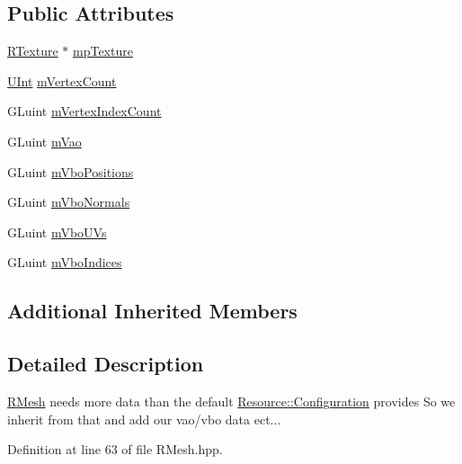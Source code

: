 \subsection*{Public Attributes}
\begin{DoxyCompactItemize}
\item 
\hyperlink{classgl_1_1_r_texture}{R\-Texture} $\ast$ \hyperlink{classgl_1_1_r_mesh_1_1_configuration_ab1700b1f9397d2176155d3403be81042}{mp\-Texture}
\item 
\hyperlink{_basic_types_8hpp_a11c112f01a7ad8f767fd48bc916463a3}{U\-Int} \hyperlink{classgl_1_1_r_mesh_1_1_configuration_ad3c135218126bd3aef6c177a479e6b98}{m\-Vertex\-Count}
\item 
G\-Luint \hyperlink{classgl_1_1_r_mesh_1_1_configuration_a9c44c3555d5f1b258df8fa2792750ea2}{m\-Vertex\-Index\-Count}
\item 
G\-Luint \hyperlink{classgl_1_1_r_mesh_1_1_configuration_a36cb6c53dd019a4077010f774119784f}{m\-Vao}
\item 
G\-Luint \hyperlink{classgl_1_1_r_mesh_1_1_configuration_af9085868a69ebb507797023737b341a6}{m\-Vbo\-Positions}
\item 
G\-Luint \hyperlink{classgl_1_1_r_mesh_1_1_configuration_a3e3e9308bee5e7c805a521e246bfbf01}{m\-Vbo\-Normals}
\item 
G\-Luint \hyperlink{classgl_1_1_r_mesh_1_1_configuration_a1dbf1ac4b9cf4099d7bb153cc45dac73}{m\-Vbo\-U\-Vs}
\item 
G\-Luint \hyperlink{classgl_1_1_r_mesh_1_1_configuration_a31d5227781d692261eb7404a87eb691f}{m\-Vbo\-Indices}
\end{DoxyCompactItemize}
\subsection*{Additional Inherited Members}


\subsection{Detailed Description}
\hyperlink{classgl_1_1_r_mesh}{R\-Mesh} needs more data than the default \hyperlink{classgl_1_1_resource_1_1_configuration}{Resource\-::\-Configuration} provides So we inherit from that and add our vao/vbo data ect... 

Definition at line 63 of file R\-Mesh.\-hpp.



